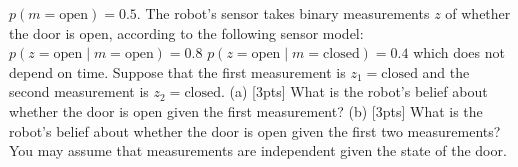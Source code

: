 \documentclass[a4paper,10pt]{article}
\begin{document}
$p(m=\text{open})=0.5$. The robot's sensor takes binary measurements $z$ of whether the door is open, 
according to the following sensor model:
\newline
\newline
$p(z=\text{open}\;|\;m=\text{open})=0.8$
\newline
$p(z=\text{open}\;|\;m=\text{closed})=0.4$
\newline
\newline
\noindent which does not depend on time. Suppose that the first measurement is $z_1=\text{closed}$ and the second measurement is $z_2=\text{closed}$. 
\newline
\newline
\newline
(a) [3pts] What is the robot's belief about whether the door is open given the first measurement? 
\newline
\newline
\newline
\newline
\newline
\newline
\newline
\newline
\newline
\newline
\newline
\newline
\newline
\newline
\newline
\newline
\newline
\newline
(b) [3pts] What is the robot's belief about whether the door is open given the first two measurements? You may assume
that measurements are independent given the state of the door.
\newline





   
\end{document}
